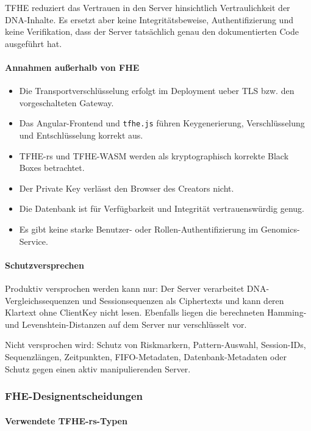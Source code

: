 TFHE reduziert das Vertrauen in den Server hinsichtlich Vertraulichkeit
der DNA-Inhalte. Es ersetzt aber keine Integritätsbeweise, Authentifizierung und keine Verifikation, dass der
Server tatsächlich genau den dokumentierten Code ausgeführt hat.

\paragraph{Annahmen außerhalb von
FHE}\label{annahmen-ausserhalb-von-fhe}

\begin{itemize}
\item
  Die Transportverschlüsselung erfolgt im Deployment ueber TLS bzw. den
  vorgeschalteten Gateway.
\item
  Das Angular-Frontend und \texttt{tfhe.js} führen Keygenerierung,
  Verschlüsselung und Entschlüsselung korrekt aus.
\item
  TFHE-rs und TFHE-WASM werden als kryptographisch korrekte Black Boxes
  betrachtet.
\item
  Der Private Key verlässt den Browser des Creators nicht.
\item
  Die Datenbank ist für Verfügbarkeit und Integrität
  vertrauenswürdig genug.
\item
  Es gibt keine starke Benutzer- oder Rollen-Authentifizierung im
  Genomics-Service.
\end{itemize}

\paragraph{Schutzversprechen}\label{schutzversprechen}

Produktiv versprochen werden kann nur: Der Server verarbeitet
DNA-Vergleichssequenzen und Sessionsequenzen als Ciphertexts und kann
deren Klartext ohne ClientKey nicht lesen. Ebenfalls liegen die
berechneten Hamming- und Levenshtein-Distanzen auf dem Server nur
verschlüsselt vor.

Nicht versprochen wird: Schutz von Riskmarkern, Pattern-Auswahl,
Session-IDs, Sequenzlängen, Zeitpunkten, FIFO-Metadaten,
Datenbank-Metadaten oder Schutz gegen einen aktiv manipulierenden
Server.

\subsubsection{FHE-Designentscheidungen}

\paragraph{Verwendete TFHE-rs-Typen}\label{verwendete-tfhe-rs-typen}

